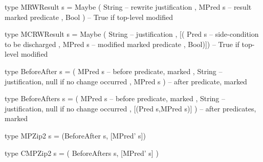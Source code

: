 \begin{code}
type MRWResult s
 = Maybe ( String  -- rewrite justification
         , MPred s  -- result marked predicate
         , Bool )  -- True if top-level modified

type MCRWResult s
 = Maybe ( String      -- justification
         , [( Pred s   -- side-condition to be discharged
            , MPred s   -- modified marked predicate
            , Bool)])  -- True if top-level modified
\end{code}

\begin{code}
type BeforeAfter s
 = ( MPred s   -- before predicate, marked
   , String      -- justification, null if no change occurred
   , MPred s ) -- after predicate, marked
\end{code}

\begin{code}
type BeforeAfters s
 = ( MPred s   -- before predicate, marked
   , String      -- justification, null if no change occurred
   , [(Pred s,MPred s)] ) -- after predicates, marked
\end{code}


\begin{code}
type MPZip2 s = (BeforeAfter s, [MPred' s])
\end{code}


\begin{code}
type CMPZip2 s = ( BeforeAfters s, [MPred' s] )
\end{code}
